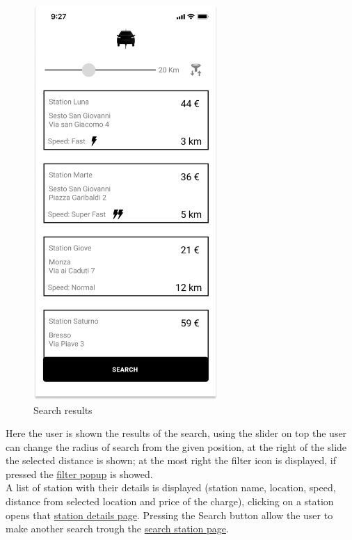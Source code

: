 \begin{figure}[H]
    \centering
    \includegraphics[keepaspectratio, height=15cm]{AppInterface/Results.png}
    \caption{Search results}
    \label{fig:Results}
\end{figure}
Here the user is shown the results of the search, using the slider on top the user can change the radius of search from the given position, at the right of the slide the selected distance is shown; at the most right the filter icon is displayed, if pressed the \hyperref[fig:Filters]{filter popup} is showed.\\
A list of station with their details is displayed (station name, location, speed, distance from selected location and price of the charge), clicking on a station opens that \hyperref[fig:StationDetails]{station details page}. Pressing the Search button allow the user to make another search trough the \hyperref[fig:Search]{search station page}.
